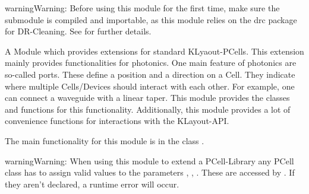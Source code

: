 \documentclass[a4paper,10pt,english]{sphinxmanual}
\begin{document}
\begin{sphinxadmonition}{warning}{Warning:}
Before using this module for the first time, make sure the  submodule is compiled and importable, as this  module
relies on the drc package for DR-Cleaning. See  for further details.
\end{sphinxadmonition}

A Module which provides extensions for standard KLyaout-PCells. This extension mainly provides functionalities for
photonics. One main feature of photonics are so-called ports. These define a position and a direction on a Cell.
They indicate where multiple Cells/Devices should interact with each other. For example, one can connect a waveguide
with a linear taper. This module provides the classes and functions for this functionality. Additionally, this module
provides a lot of convenience functions for interactions with the KLayout-API.

The main functionality for this module is in the class {\hyperref[\detokenize{photonics/photonics:kppc.photonics.PhotDevice}]{}}.

\begin{sphinxadmonition}{warning}{Warning:}
When using this module to extend a PCell-Library any PCell class has to assign valid values to the
parameters  ,  ,  . These are accessed by {\hyperref[\detokenize{photonics/photonics:kppc.photonics.PhotDevice}]{}}. If they
aren’t declared, a runtime error will occur.
\end{sphinxadmonition}
\end{document}
